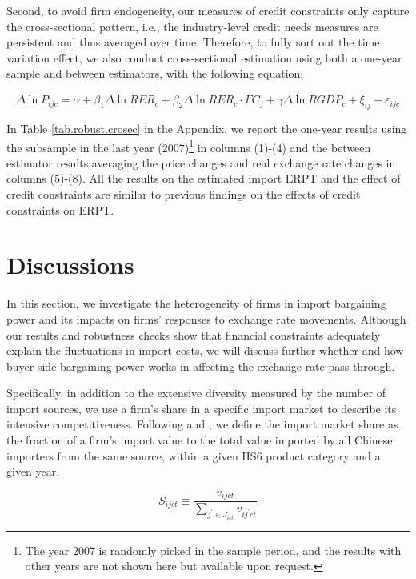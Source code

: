 \documentclass[12pt]{article}
\begin{document}
Second, to avoid firm endogeneity, our measures of credit constraints only capture the cross-sectional pattern, i.e., the industry-level credit needs measures are persistent and thus averaged over time. Therefore, to fully sort out the time variation effect, we also conduct cross-sectional estimation using both a one-year sample and between estimators, with the following equation:

\begin{equation}
	\overline{\Delta \ln P}_{ijc}=\alpha+\beta_{1} \overline{\Delta \ln RER}_{c}+\beta_{2} \overline{\Delta \ln RER}_{c} \cdot FC_{j}+\gamma \overline{\Delta \ln RGDP}_{c}+\bar{\xi}_{ij} +\varepsilon_{ijc}
	\label{eq.credit.crosec}
\end{equation}

In Table \ref{tab.robust.crosec} in the Appendix, we report the one-year results using the subsample in the last year (2007)\footnote{The year 2007 is randomly picked in the sample period, and the results with other years are not shown here but available upon request.} in columns (1)-(4) and the between estimator results averaging the price changes and real exchange rate changes in columns (5)-(8). All the results on the estimated import ERPT and the effect of credit constraints are similar to previous findings on the effects of credit constraints on ERPT.

\section{Discussions} \label{Discussion}

In this section, we investigate the heterogeneity of firms in import bargaining power and its impacts on firms’ responses to exchange rate movements. Although our results and robustness checks show that financial constraints adequately explain the fluctuations in import costs, we will discuss further whether and how buyer-side bargaining power works in affecting the exchange rate pass-through.

Specifically, in addition to the extensive diversity measured by the number of import sources, we use a firm's share in a specific import market to describe its intensive competitiveness. Following \cite{aik2014} and \cite{devereux2017}, we define the import market share as the fraction of a firm's import value to the total value imported by all Chinese importers from the same source, within a given HS6 product category and a given year. 

$$
S_{ijct} \equiv \frac{v_{ijct}}{\sum_{j^{\prime} \in J_{ict}} v_{ij^{\prime}ct}}
$$
\end{document}
